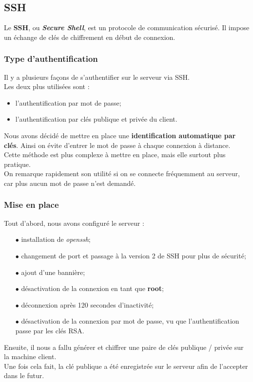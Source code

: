 \subsection{SSH}
\label{subsec:ssh}

Le \textbf{SSH}, ou \textit{\textbf{Secure Shell}}, est un protocole de
communication sécurisé. Il impose un échange de clés de chiffrement en début de
connexion.


\subsubsection{Type d'authentification}
\label{subsubsec:type-authentification}

Il y a plusieurs façons de s'authentifier sur le serveur via SSH. \\
Les deux plus utilisées sont :
\begin{itemize}
    \item l'authentification par mot de passe;
    \item l'authentification par clés publique et privée du client. \\
\end{itemize}

Nous avons décidé de mettre en place une \textbf{identification automatique par
clés}. Ainsi on évite d'entrer le mot de passe à chaque connexion à distance. \\
Cette méthode est plus complexe à mettre en place, mais elle surtout plus
pratique. \\

On remarque rapidement son utilité si on se connecte fréquemment au serveur, car
plus aucun mot de passe n'est demandé.


\subsubsection{Mise en place}
\label{subsubsec:mise-en-place}

Tout d'abord, nous avons configuré le serveur :
\begin{itemize}

    \item[$\bullet$] installation de \textit{openssh};
    \item[$\bullet$] changement de port et passage à la version 2 de SSH pour plus de
    sécurité;
    \item[$\bullet$] ajout d'une bannière;
    \item[$\bullet$] désactivation de la connexion en tant que \textbf{root};
    \item[$\bullet$] déconnexion après 120 secondes d'inactivité;
    \item[$\bullet$] désactivation de la connexion par mot de passe, vu que l'authentification
    passe par les clés RSA. \\

\end{itemize}

Ensuite, il nous a fallu générer et chiffrer une paire de clés publique /
privée sur la machine client. \\
Une fois cela fait, la clé publique a été enregistrée sur le serveur afin de
l'accepter dans le futur.


